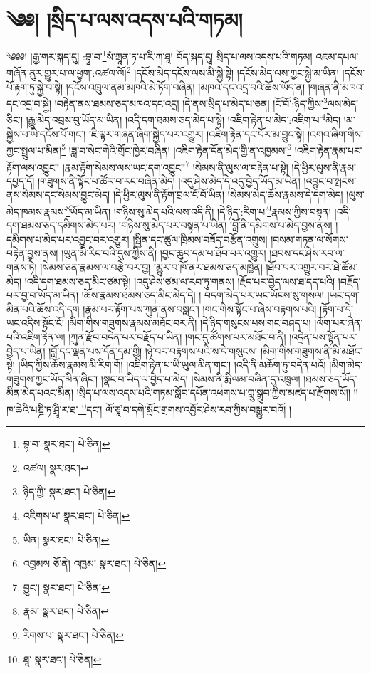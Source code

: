 \setcounter{footnote}{0} 
\chapter{༄༅། །སྲིད་པ་ལས་འདས་པའི་གཏམ།}༄༅༅། །རྒྱ་གར་སྐད་དུ། :བྷཱ་བ་\footnote{བྷ་བ་  སྣར་ཐང་།  པེ་ཅིན། }སཾ་ཀྲཱན་ཏ་པ་རི་ཀ་ཐཱ། བོད་སྐད་དུ། སྲིད་པ་ལས་འདས་པའི་གཏམ། འཇམ་དཔལ་གཞོན་ནུར་གྱུར་པ་ལ་ཕྱག་:འཚལ་ལོ།\footnote{འཚལ།  སྣར་ཐང་། } །དངོས་མེད་དངོས་ལས་མི་སྐྱེ་སྟེ། །དངོས་མེད་ལས་ཀྱང་སྐྱེ་མ་ཡིན། །དངོས་པོ་རྟག་ཏུ་སྐྱེ་བ་སྟེ། །དངོས་འཁྲུལ་ནམ་མཁའི་མེ་ཏོག་བཞིན། །མཁའ་དང་འདྲ་བའི་ཆོས་ཡོད་ན། །གཞན་ནི་མཁའ་དང་འདྲ་བ་སྐྱེ། །བརྟེན་ནས་ཐམས་ཅད་མཁའ་དང་འདྲ། །དེ་ནས་སྲིད་པ་མེད་པ་ཅན། །ངོ་བོ་:ཉིད་ཀྱིས་\footnote{ཉིད་ཀྱི་  སྣར་ཐང་།  པེ་ཅིན། }ལས་མེད་ཅིང་། །རྒྱུ་མེད་འབྲས་བུ་ཡོད་མ་ཡིན། །འདི་དག་ཐམས་ཅད་མེད་པ་སྟེ། །འཇིག་རྟེན་པ་མེད་:འཇིག་པ་\footnote{འཇིགས་པ་  སྣར་ཐང་།  པེ་ཅིན། }མེད། །མ་སྐྱེས་པ་ཡི་དངོས་པོ་གང་། །ཇི་ལྟར་གཞན་ཞིག་སྐྱེད་པར་འགྱུར། །འཇིག་རྟེན་དང་པོར་མ་བྱུང་སྟེ། །འགའ་ཞིག་གིས་ཀྱང་སྤྲུལ་པ་མིན།\footnote{ཡིན།  སྣར་ཐང་།  པེ་ཅིན། } །ཟླ་བ་སེང་གེའི་གྲོང་ཁྱེར་བཞིན། །འཇིག་རྟེན་དོན་མེད་གྱི་ན་འཁྱམས།\footnote{འབྱམས  ཅོ་ནེ། འཁྱམ།  སྣར་ཐང་།  པེ་ཅིན། } །འཇིག་རྟེན་རྣམ་པར་རྟོག་ལས་འབྱུང་། །རྣམ་རྟོག་སེམས་ལས་ཡང་དག་འབྱུང་།\footnote{བྱུང་།  སྣར་ཐང་།  པེ་ཅིན། } །སེམས་ནི་ལུས་ལ་བརྟེན་པ་སྟེ། །དེ་ཕྱིར་ལུས་ནི་རྣམ་དཔྱད་དོ། །གཟུགས་ནི་སྟོང་པ་ཚོར་བ་རང་བཞིན་མེད། །འདུ་ཤེས་མེད་དེ་འདུ་བྱེད་ཡོད་མ་ཡིན། །འབྱུང་བ་སྤངས་ནས་སེམས་དང་སེམས་བྱུང་མེད། །དེ་ཕྱིར་ལུས་ནི་རྟོག་བྲལ་ངོ་བོ་ཡིན། །སེམས་མེད་ཆོས་རྣམས་དེ་དག་མེད། །ལུས་མེད་ཁམས་རྣམས་\footnote{རྣམ་  སྣར་ཐང་།  པེ་ཅིན། }ཡོད་མ་ཡིན། །གཉིས་སུ་མེད་པའི་ལས་འདི་ནི། །དེ་ཉིད་:རིག་པ་\footnote{རིགས་པ་  སྣར་ཐང་།  པེ་ཅིན། }རྣམས་ཀྱིས་བསྟན། །འདི་དག་ཐམས་ཅད་དམིགས་མེད་པར། །གཉིས་སུ་མེད་པར་བསྟན་པ་ཡིན། །བློ་ནི་དམིགས་པ་མེད་བྱས་ནས། །དམིགས་པ་མེད་པར་འབྱུང་བར་འགྱུར། །སྦྱིན་དང་ཚུལ་ཁྲིམས་བཟོད་བརྩོན་འགྲུས། །བསམ་གཏན་ལ་སོགས་བརྟེན་བྱས་ནས། །ཡུན་མི་རིང་བའི་དུས་ཀྱིས་ནི། །བྱང་ཆུབ་དམ་པ་ཐོབ་པར་འགྱུར། །ཐབས་དང་ཤེས་རབ་ལ་གནས་ཏེ། །སེམས་ཅན་རྣམས་ལ་བརྩེ་བར་བྱ། །མྱུར་བ་ཁོ་ནར་ཐམས་ཅད་མཁྱེན། །ཐོབ་པར་འགྱུར་བར་ཐེ་ཚོམ་མེད། །འདི་དག་ཐམས་ཅད་མིང་ཙམ་སྟེ། །འདུ་ཤེས་ཙམ་ལ་རབ་ཏུ་གནས། །རྗོད་པར་བྱེད་ལས་ཐ་དད་པའི། །བརྗོད་པར་བྱ་བ་ཡོད་མ་ཡིན། །ཆོས་རྣམས་ཐམས་ཅད་མིང་མེད་དེ། །
བདག་མེད་པར་ཡང་ཡོངས་སུ་གསལ། །ཡང་དག་མིན་པའི་ཆོས་འདི་དག །རྣམ་པར་རྟོག་པས་ཀུན་ནས་བསླང་། །གང་གིས་སྟོང་པ་ཞེས་བརྟགས་པའི། །རྟོག་པ་དེ་ཡང་འདིས་སྟོང་ངོ། །མིག་གིས་གཟུགས་རྣམས་མཐོང་བར་ནི། །དེ་ཉིད་གསུངས་པས་གང་བཤད་པ། །ལོག་པར་ཞེན་པའི་འཇིག་རྟེན་ལ། །ཀུན་རྫོབ་བདེན་པར་བརྗོད་པ་ཡིན། །གང་དུ་ཚོགས་པར་མཐོང་བ་ནི། །འདྲེན་པས་སྟོན་པར་བྱེད་པ་ཡིན། །བློ་དང་ལྡན་པས་དོན་དམ་གྱི། །ཉེ་བར་བརྟགས་པའི་ས་དེ་གསུངས། །མིག་གིས་གཟུགས་ནི་མི་མཐོང་སྟེ། །ཡིད་ཀྱིས་ཆོས་རྣམས་མི་རིག་གོ། །འཇིག་རྟེན་པ་ཡི་ཡུལ་མིན་གང་། །འདི་ནི་མཆོག་ཏུ་བདེན་པའོ། །མིག་མེད་གཟུགས་ཀྱང་ཡོད་མིན་ཞིང་། །སྣང་བ་ཡིད་ལ་བྱེད་པ་མེད། །སེམས་ནི་རྨི་ལམ་བཞིན་དུ་འཁྲུལ། །ཐམས་ཅད་ཡོད་མིན་མེད་པའང་མིན། །སྲིད་པ་ལས་འདས་པའི་གཏམ་སློབ་དཔོན་འཕགས་པ་ཀླུ་སྒྲུབ་ཀྱིས་མཛད་པ་རྫོགས་སོ།། །།ཁ་ཆེའི་པཎྜི་ཏ་ཤྲཱི་ར་ཐ་\footnote{ཐཱ་  སྣར་ཐང་།  པེ་ཅིན། }དང་། ལོ་ཙཱ་བ་དགེ་སློང་གྲགས་འབྱོར་ཤེས་རབ་ཀྱིས་བསྒྱུར་བའོ། ། 